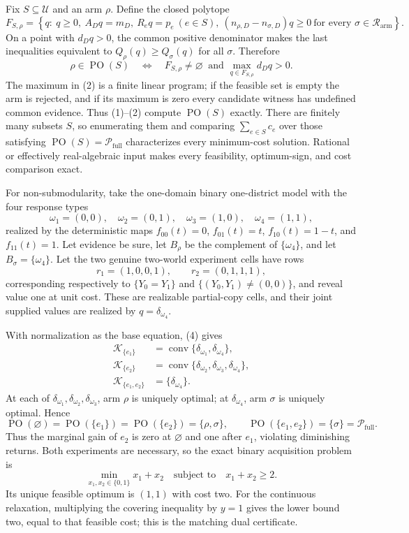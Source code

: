 Fix \(S\subseteq\mathcal U\) and an arm \(\rho\). Define the closed polytope
\[
F_{S,\rho}=\left\{q:\ q\geq0,\ A_Dq=m_D,\ R_eq=p_e\ (e\in S),
\ (n_{\rho,D}-n_{\sigma,D})q\geq0\ \text{for every }\sigma\in\mathcal R_{\mathrm{arm}}\right\}.\tag{1}
\]
On a point with \(d_Dq>0\), the common positive denominator makes the last inequalities equivalent to
\(Q_\rho(q)\geq Q_\sigma(q)\) for all \(\sigma\). Therefore
\[
\rho\in\operatorname{PO}(S)\quad\Longleftrightarrow\quad
F_{S,\rho}\ne\varnothing\ \text{ and }
\max_{q\in F_{S,\rho}}d_Dq>0.\tag{2}
\]
The maximum in (2) is a finite linear program; if the feasible set is empty the arm is rejected, and if its maximum is zero every candidate witness has undefined common evidence. Thus (1)--(2) compute \(\operatorname{PO}(S)\) exactly. There are finitely many subsets \(S\), so enumerating them and comparing \(\sum_{e\in S}c_e\) over those satisfying
\(\operatorname{PO}(S)=\mathcal P_{\mathrm{full}}\) characterizes every minimum-cost solution. Rational or effectively real-algebraic input makes every feasibility, optimum-sign, and cost comparison exact.

For non-submodularity, take the one-domain binary one-district model with the four response types
\[
\omega_1=(0,0),\quad\omega_2=(0,1),\quad
\omega_3=(1,0),\quad\omega_4=(1,1),\tag{3}
\]
realized by the deterministic maps \(f_{00}(t)=0\), \(f_{01}(t)=t\),
\(f_{10}(t)=1-t\), and \(f_{11}(t)=1\). Let evidence be sure, let
\(B_\rho\) be the complement of \(\{\omega_4\}\), and let \(B_\sigma=\{\omega_4\}\). Let the two genuine two-world experiment cells have rows
\[
r_1=(1,0,0,1),\qquad r_2=(0,1,1,1),\tag{4}
\]
corresponding respectively to \(\{Y_0=Y_1\}\) and
\(\{(Y_0,Y_1)\ne(0,0)\}\), and reveal value one at unit cost. These are realizable partial-copy cells, and their joint supplied values are realized by \(q=\delta_{\omega_4}\).

With normalization as the base equation, (4) gives
\[
\begin{aligned}
\mathcal K_{\{e_1\}}&=\operatorname{conv}\{\delta_{\omega_1},\delta_{\omega_4}\},\\
\mathcal K_{\{e_2\}}&=\operatorname{conv}\{\delta_{\omega_2},\delta_{\omega_3},\delta_{\omega_4}\},\\
\mathcal K_{\{e_1,e_2\}}&=\{\delta_{\omega_4}\}.
\end{aligned}\tag{5}
\]
At each of \(\delta_{\omega_1},\delta_{\omega_2},\delta_{\omega_3}\), arm \(\rho\) is uniquely optimal; at \(\delta_{\omega_4}\), arm \(\sigma\) is uniquely optimal. Hence
\[
\operatorname{PO}(\varnothing)=\operatorname{PO}(\{e_1\})
=\operatorname{PO}(\{e_2\})=\{\rho,\sigma\},\qquad
\operatorname{PO}(\{e_1,e_2\})=\{\sigma\}=\mathcal P_{\mathrm{full}}.\tag{6}
\]
Thus the marginal gain of \(e_2\) is zero at \(\varnothing\) and one after \(e_1\), violating diminishing returns. Both experiments are necessary, so the exact binary acquisition problem is
\[
\min_{x_1,x_2\in\{0,1\}}x_1+x_2\quad\text{subject to}\quad x_1+x_2\geq2.\tag{7}
\]
Its unique feasible optimum is \((1,1)\) with cost two. For the continuous relaxation, multiplying the covering inequality by \(y=1\) gives the lower bound two, equal to that feasible cost; this is the matching dual certificate.